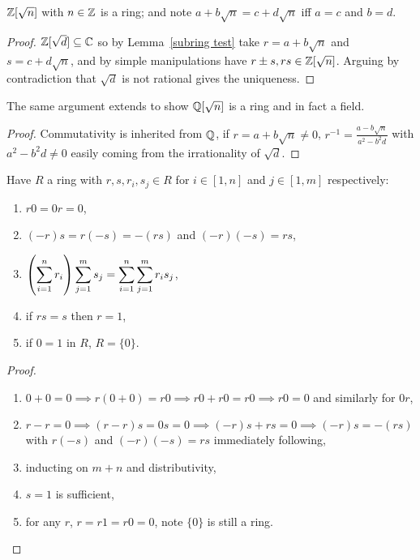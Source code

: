 \documentclass{report}
\begin{document}
\begin{example}
    $\mathbb{Z}[\sqrt{n}]$ with $n\in\mathbb{Z}$ is a ring; and note $a+b\sqrt{n}=c+d\sqrt{n}$ iff $a=c$ and $b=d$. \begin{proof}
        $\mathbb{Z}[\sqrt{d}]\subseteq\mathbb{C}$ so by Lemma~\ref{subring test} take $r=a+b\sqrt{n}$ and $s=c+d\sqrt{n}$, and by simple manipulations have $r\pm s, rs\in \mathbb{Z}[\sqrt{n}]$. Arguing by contradiction that $\sqrt{d}$ is not rational gives the uniqueness.
    \end{proof}
\end{example}

\begin{corollary}
    The same argument extends to show $\mathbb{Q}[\sqrt{n}]$ is a ring and in fact a field.\begin{proof}
        Commutativity is inherited from $\mathbb{Q}$, if $r=a+b\sqrt{n}\neq 0$, $\displaystyle r^{-1}=\frac{a-b\sqrt{n}}{a^2-b^2d}$ with $a^2-b^2d\neq0$ easily coming from the irrationality of $\sqrt{d}$.
    \end{proof}
\end{corollary}

\begin{propositions}
    Have $R$ a ring with $r,s,r_i,s_j\in R$ for $i\in[1,n]$ and $j\in[1,m]$ respectively:\begin{enumerate}
        \item $r0=0r=0$,
        \item $(-r)s=r(-s)=-(rs)$ and $(-r)(-s)=rs$,
        \item $\displaystyle \br{\sum_{i=1}^nr_i}\sum_{j=1}^ms_j=\sum_{i=1}^n\sum_{j=1}^mr_is_j$,
        \item if $rs=s$ then $r=1$,
        \item if $0=1$ in $R$, $R=\{0\}$.
    \end{enumerate}
    \begin{proof}
        \begin{enumerate}
            \item $0+0=0\implies r(0+0)=r0\implies r0+r0=r0\implies r0=0$ and similarly for $0r$,
            \item $r-r=0\implies (r-r)s=0s=0 \implies (-r)s + rs = 0 \implies (-r)s=-(rs)$ with $r(-s)$ and $(-r)(-s) = rs$ immediately following,
            \item inducting on $m+n$ and distributivity,
            \item $s=1$ is sufficient,
            \item for any $r$, $r=r1=r0=0$, note $\{0\}$ is still a ring.
        \end{enumerate}
    \end{proof}
\end{propositions}
\end{document}
